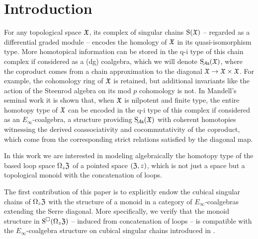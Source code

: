 
\section{Introduction}

For any topological space $\mathfrak{X}$, its complex of singular chains $\operatorname{S}(\mathfrak{X})$ -- regarded as a differential graded module -- encodes the homology of $\mathfrak{X}$ in its quasi-isomorphism type.
More homotopical information can be stored in the q-i type of this chain complex if considered as a (dg) coalgebra, which we will denote $\operatorname{S_{\!{\mathcal{A}\mathsf{s}}}}(\mathfrak{X})$, where the coproduct comes from a chain approximation to the diagonal $\mathfrak{X} \to \mathfrak{X} \times \mathfrak{X}$.
For example, the cohomology ring of $\mathfrak{X}$ is retained, but additional invariants like the action of the Steenrod algebra on its mod $p$ cohomology is not.
In Mandell's seminal work \cite{mandell2006homotopy_type} it is shown that, when $\mathfrak{X}$ is nilpotent and finite type, the entire homotopy type of $\mathfrak{X}$ can be encoded in the q-i type of this complex if considered as an $E_\infty$-coalgebra, a structure providing $\operatorname{S_{\!{\mathcal{A}\mathsf{s}}}}(\mathfrak{X})$ with coherent homotopies witnessing the derived coassociativity and cocommutativity of the coproduct, which come from the corresponding strict relations satisfied by the diagonal map.

In this work we are interested in modeling algebraically the homotopy type of the based loop space $\Omega_z \mathfrak{Z}$ of a pointed space $(\mathfrak{Z},z)$, which is not just a space but a topological monoid with the concatenation of loops.

The first contribution of this paper is to explicitly endow the cubical singular chains of $\Omega_z \mathfrak{Z}$ with the structure of a monoid in a category of $E_\infty$-coalgebras extending the Serre diagonal.
More specifically, we verify that the monoid structure in $\operatorname{S^{\square}}(\Omega_z \mathfrak{Z})$ -- induced from concatenation of loops -- is compatible with the $E_\infty$-coalgebra structure on cubical singular chains introduced in \cite{medina2022cube_einfty}.

